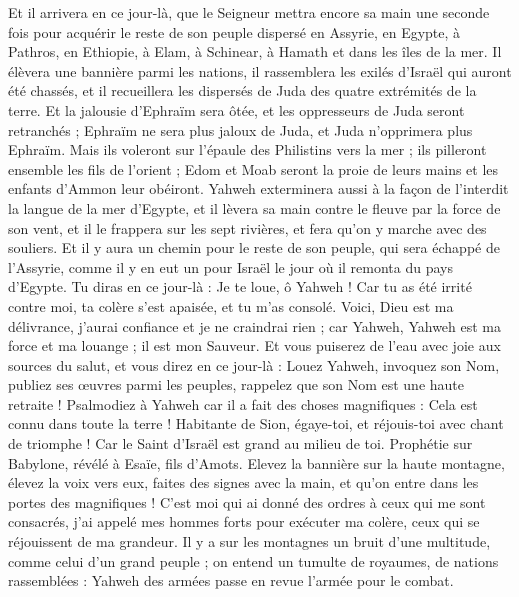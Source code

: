 \begin{multicols}{2}
Et il arrivera en ce jour-là, que le Seigneur mettra encore sa main une seconde fois pour acquérir le reste de son peuple dispersé en Assyrie, en Egypte, à Pathros, en Ethiopie, à Elam, à Schinear, à Hamath et dans les îles de la mer.
Il élèvera une bannière parmi les nations, il rassemblera les exilés d'Israël qui auront été chassés, et il recueillera les dispersés de Juda des quatre extrémités de la terre.
Et la jalousie d'Ephraïm sera ôtée, et les oppresseurs de Juda seront retranchés ; Ephraïm ne sera plus jaloux de Juda, et Juda n'opprimera plus Ephraïm.
Mais ils voleront sur l'épaule des Philistins vers la mer ; ils pilleront ensemble les fils de l'orient ; Edom et Moab seront la proie de leurs mains et les enfants d'Ammon leur obéiront.
Yahweh exterminera aussi à la façon de l'interdit la langue de la mer d'Egypte, et il lèvera sa main contre le fleuve par la force de son vent, et il le frappera sur les sept rivières, et fera qu'on y marche avec des souliers.
Et il y aura un chemin pour le reste de son peuple, qui sera échappé de l'Assyrie, comme il y en eut un pour Israël le jour où il remonta du pays d'Egypte.
\VerseOne{}Tu diras en ce jour-là : Je te loue, ô Yahweh ! Car tu as été irrité contre moi, ta colère s'est apaisée, et tu m'as consolé.
Voici, Dieu est ma délivrance, j'aurai confiance et je ne craindrai rien ; car Yahweh, Yahweh est ma force et ma louange ; il est mon Sauveur.
Et vous puiserez de l'eau avec joie aux sources du salut,
et vous direz en ce jour-là : Louez Yahweh, invoquez son Nom, publiez ses œuvres parmi les peuples, rappelez que son Nom est une haute retraite !
Psalmodiez à Yahweh car il a fait des choses magnifiques : Cela est connu dans toute la terre !
Habitante de Sion, égaye-toi, et réjouis-toi avec chant de triomphe ! Car le Saint d'Israël est grand au milieu de toi.
\VerseOne{}Prophétie sur Babylone, révélé à Esaïe, fils d'Amots.
Elevez la bannière sur la haute montagne, élevez la voix vers eux, faites des signes avec la main, et qu'on entre dans les portes des magnifiques !
C'est moi qui ai donné des ordres à ceux qui me sont consacrés, j'ai appelé mes hommes forts pour exécuter ma colère, ceux qui se réjouissent de ma grandeur.
Il y a sur les montagnes un bruit d'une multitude, comme celui d'un grand peuple ; on entend un tumulte de royaumes, de nations rassemblées : Yahweh des armées passe en revue l'armée pour le combat.

\end{multicols}
